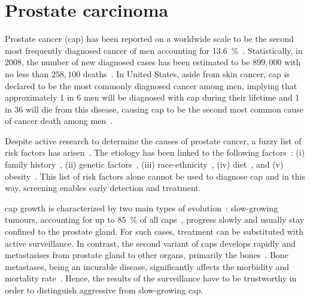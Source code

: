 
\section{Prostate carcinoma}
Prostate cancer (\acs{cap}) has been reported on a worldwide scale to be the second most frequently diagnosed cancer of men accounting for \SI{13.6}{\percent}~\cite{Ferlay2010}.
Statistically, in 2008, the number of new diagnosed cases has been estimated to be $899,000$ with no less than $258,100$ deaths~\cite{Ferlay2010}.
In United States, aside from skin cancer, \ac{cap} is declared to be the most commonly diagnosed cancer among men, implying that approximately 1 in 6 men will be diagnosed with \ac{cap} during their lifetime and 1 in 36 will die from this disease, causing \ac{cap} to be the second most common cause of cancer death among men~\cite{Siegel2013,Society2013}.

Despite active research to determine the causes of prostate cancer, a fuzzy list of risk factors has arisen~\cite{Society2010}.
The etiology has been linked to the following factors~\cite{Society2010}: (i) family history~\cite{Giovannucci2007,Steinberg1990}, (ii) genetic factors~\cite{Freedman2006,Amundadottir2006,Agalliu2009}, (iii) race-ethnicity~\cite{Giovannucci2007,Hoffman2001}, (iv) diet~\cite{Giovannucci2007,Ma2009,Alexander2010}, and (v) obesity~\cite{Giovannucci2007,Rodriguez2007}.
This list of risk factors alone cannot be used to diagnose \ac{cap} and in this way, screening enables early detection and treatment.

\ac{cap} growth is characterized by two main types of evolution~\cite{Strum2005}: slow-growing tumours, accounting for up to \SI{85}{\percent} of all \acp{cap}~\cite{Lu-Yao2009}, progress slowly and usually stay confined to the prostate gland.
For such cases, treatment can be substituted with active surveillance.
In contrast, the second variant of \acp{cap} develops rapidly and metastasises from prostate gland to other organs, primarily the bones~\cite{Oster2013}.
Bone metastases, being an incurable disease, significantly affects the morbidity and mortality rate~\cite{Ye2007}.
Hence, the results of the surveillance have to be trustworthy in order to distinguish aggressive from slow-growing \ac{cap}.

